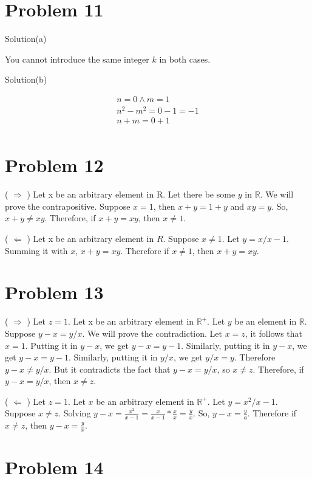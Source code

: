 \documentclass{article}
\begin{document}
\section{Problem 11}

Solution(a)

You cannot introduce the same integer $k$ in both cases.

Solution(b)

\begin{align*}
  n = 0 \land m = 1 \\
  n^2 - m^2 = 0 - 1 = -1 \\
  n + m = 0 + 1 \\
\end{align*}

\section{Problem 12}

( $\Rightarrow$ ) Let x be an arbitrary element in R. Let there be
some $y$ in $\mathbb{R}$. We will prove the contrapositive. Suppose $x
= 1$, then $x + y = 1 + y$ and $xy = y$. So, $x + y \neq xy$.
Therefore, if $x + y = xy$, then $x \neq 1$.

( $\Leftarrow$ ) Let x be an arbitrary element in $R$. Suppose $x \neq
1$. Let $y = x / x - 1$. Summing it with $x$, $x+y = xy$. Therefore if
$ x \neq 1$, then $x + y = xy$.

\section{Problem 13}

( $\Rightarrow$ ) Let $z = 1$. Let x be an arbitrary element in
$\mathbb{R^+}$. Let $y$ be an element in $\mathbb{R}$. Suppose $y - x
= y / x$. We will prove the contradiction. Let $x = z$, it follows
that $x = 1$. Putting it in $y - x$, we get $y -x = y - 1$. Similarly,
putting it in $y - x$, we get $y - x = y - 1$. Similarly, putting it
in $y / x$, we get $y / x = y$. Therefore $y - x \neq y/x$. But it
contradicts the fact that $y - x = y / x$, so $x \neq z$. Therefore,
if $y -x = y/x$, then $x \neq z$.

( $\Leftarrow$ ) Let $z = 1$. Let $x$ be an arbitrary element in
$\mathbb{R^+}$. Let $y = x^2 / x - 1$. Suppose $x \neq z$. Solving $ y
- x = \frac{x^2}{x - 1} = \frac{x}{x - 1} * \frac{x}{x} =
\frac{y}{x}$. So, $y - x = \frac{y}{a}$. Therefore if $x \neq z$, then
$y - x = \frac{y}{x}$.

\section{Problem 14}
\end{document}
